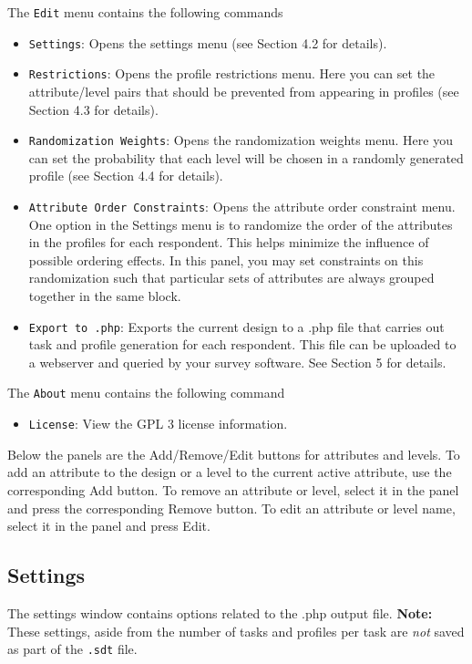\documentclass[12pt]{article}
\begin{document}
The \texttt{Edit} menu contains the following commands
\begin{itemize}
\item \texttt{Settings}: Opens the settings menu (see Section 4.2 for details).
\item \texttt{Restrictions}: Opens the profile restrictions menu. Here you can set the attribute/level pairs that should be prevented from appearing in profiles (see Section 4.3 for details).
\item \texttt{Randomization Weights}: Opens the randomization weights menu. Here you can set the probability that each level will be chosen in a randomly generated profile (see Section 4.4 for details).
\item \texttt{Attribute Order Constraints}: Opens the attribute order constraint menu. One option in the Settings menu is to randomize the order of the attributes in the profiles for each respondent. This helps minimize the influence of possible ordering effects. In this panel, you may set constraints on this randomization such that particular sets of attributes are always grouped together in the same block.
\item \texttt{Export to .php}: Exports the current design to a .php file that carries out task and profile generation for each respondent. This file can be uploaded to a webserver and queried by your survey software. See Section 5 for details.
\end{itemize}

The \texttt{About} menu contains the following command
\begin{itemize}
\item \texttt{License}: View the GPL 3 license information.
\end{itemize}

Below the panels are the Add/Remove/Edit buttons for attributes and levels. To add an attribute to the design or a level to the current active attribute, use the corresponding Add button. To remove an attribute or level, select it in the panel and press the corresponding Remove button. To edit an attribute or level name, select it in the panel and press Edit.



\subsection{Settings}

The settings window contains options related to the .php output file. \textbf{Note:} These settings, aside from the number of tasks and profiles per task are \textit{not} saved as part of the \texttt{.sdt} file.
\end{document}

